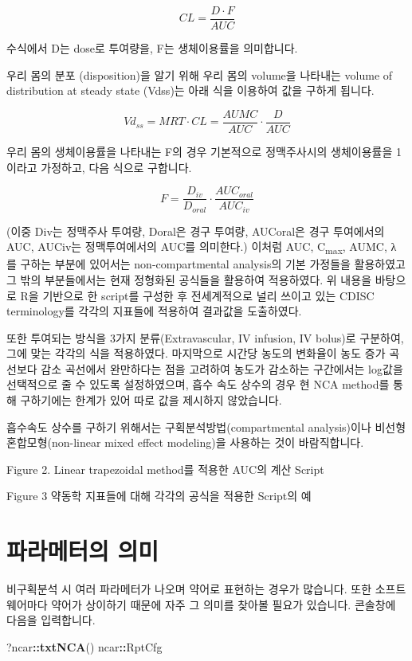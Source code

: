 \documentclass[12pt,]{krantz}
\newenvironment{Shaded}{\begin{snugshade}}{\end{snugshade}}
\newcommand{\KeywordTok}[1]{\textcolor[rgb]{0.13,0.29,0.53}{\textbf{#1}}}
\newcommand{\OperatorTok}[1]{\textcolor[rgb]{0.81,0.36,0.00}{\textbf{#1}}}
\newcommand{\NormalTok}[1]{#1}
\theoremstyle{definition}
\theoremstyle{definition}
\theoremstyle{definition}
\theoremstyle{remark}
\begin{document}
\[
CL = \frac{D \cdot F}{AUC}
\]

수식에서 D는 dose로 투여량을, F는 생체이용률을 의미합니다.

우리 몸의 분포 (disposition)을 알기 위해 우리 몸의 volume을 나타내는
volume of distribution at steady state (Vdss)는 아래 식을 이용하여 값을
구하게 됩니다.

\[
Vd_{ss} = MRT \cdot CL = \frac{AUMC}{AUC} \cdot \frac{D}{AUC}
\]

우리 몸의 생체이용률을 나타내는 F의 경우 기본적으로 정맥주사시의
생체이용률을 1이라고 가정하고, 다음 식으로 구합니다.

\[
F = \frac{D_{iv}}{D_{oral}} \cdot \frac{AUC_{oral}}{AUC_{iv}}
\]

(이중 Div는 정맥주사 투여량, Doral은 경구 투여량, AUCoral은 경구
투여에서의 AUC, AUCiv는 정맥투여에서의 AUC를 의미한다.) 이처럼 AUC,
C\textsubscript{max}, AUMC, λ 를 구하는 부분에 있어서는
non-compartmental analysis의 기본 가정들을 활용하였고 그 밖의
부분들에서는 현재 정형화된 공식들을 활용하여 적용하였다. 위 내용을
바탕으로 R을 기반으로 한 script를 구성한 후 전세계적으로 널리 쓰이고
있는 CDISC terminology를 각각의 지표들에 적용하여 결과값을 도출하였다.

또한 투여되는 방식을 3가지 분류(Extravascular, IV infusion, IV bolus)로
구분하여, 그에 맞는 각각의 식을 적용하였다. 마지막으로 시간당 농도의
변화율이 농도 증가 곡선보다 감소 곡선에서 완만하다는 점을 고려하여
농도가 감소하는 구간에서는 log값을 선택적으로 줄 수 있도록 설정하였으며,
흡수 속도 상수의 경우 현 NCA method를 통해 구하기에는 한계가 있어 따로
값을 제시하지 않았습니다.

흡수속도 상수를 구하기 위해서는 구획분석방법(compartmental analysis)이나
비선형 혼합모형(non-linear mixed effect modeling)을 사용하는 것이
바람직합니다.

Figure 2. Linear trapezoidal method를 적용한 AUC의 계산 Script

Figure 3 약동학 지표들에 대해 각각의 공식을 적용한 Script의 예

\section{파라메터의 의미}\label{parameters}

비구획분석 시 여러 파라메터가 나오며 약어로 표현하는 경우가 많습니다.
또한 소프트웨어마다 약어가 상이하기 때문에 자주 그 의미를 찾아볼 필요가
있습니다. 콘솔창에 다음을 입력합니다.

\begin{Shaded}
\begin{Highlighting}[]
\NormalTok{?ncar}\OperatorTok{::}\KeywordTok{txtNCA}\NormalTok{()}
\NormalTok{ncar}\OperatorTok{::}\NormalTok{RptCfg}
\end{Highlighting}
\end{Shaded}
\end{document}
